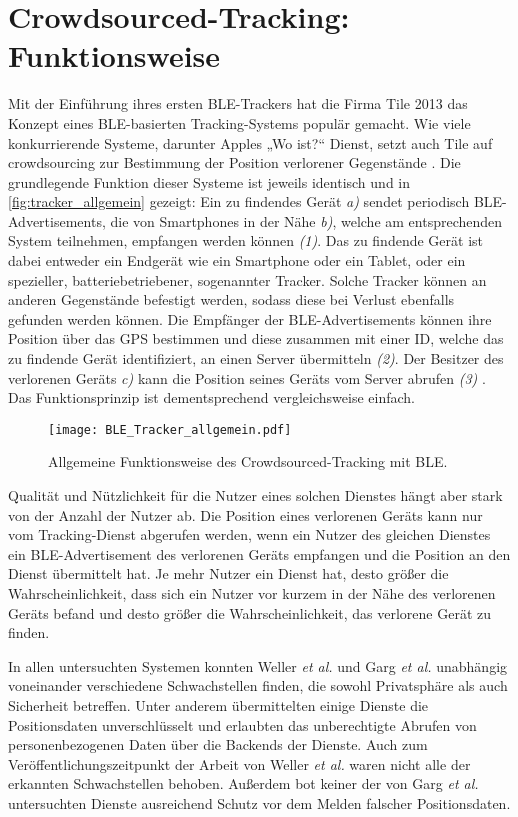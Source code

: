 \section{Crowdsourced-Tracking: Funktionsweise}
\label{sec:Funktionsweise}

Mit der Einführung ihres ersten \ac{BLE}-Trackers hat die Firma Tile 2013 das Konzept eines \ac{BLE}-basierten Tracking-Systems populär gemacht.
Wie viele konkurrierende Systeme, darunter Apples „Wo ist?“ Dienst, setzt auch Tile auf crowdsourcing zur Bestimmung der Position verlorener Gegenstände \cite{Weller_BLE_Finders}.
Die grundlegende Funktion dieser Systeme ist jeweils identisch und in \autoref{fig:tracker_allgemein} gezeigt: Ein zu findendes Gerät \textit{a)} sendet periodisch \ac{BLE}-Advertisements, die von Smartphones in der Nähe \textit{b)}, welche am entsprechenden System teilnehmen, empfangen werden können \textit{(1)}.
Das zu findende Gerät ist dabei entweder ein Endgerät wie ein Smartphone oder ein Tablet, oder ein spezieller, batteriebetriebener, sogenannter Tracker.
Solche Tracker können an anderen Gegenstände befestigt werden, sodass diese bei Verlust ebenfalls gefunden werden können.
Die Empfänger der \ac{BLE}-Advertisements können ihre Position über das \ac{GPS} bestimmen und diese zusammen mit einer ID, welche das zu findende Gerät identifiziert, an einen Server übermitteln \textit{(2)}.
Der Besitzer des verlorenen Geräts \textit{c)} kann die Position seines Geräts vom Server abrufen \textit{(3)} \cite{Garg_Secure_Tracker}.
Das Funktionsprinzip ist dementsprechend vergleichsweise einfach.
\begin{figure}[ht]
    \centering 
    \texttt{[image: BLE\_Tracker\_allgemein.pdf]}
    \caption{Allgemeine Funktionsweise des Crowdsourced-Tracking mit \ac{BLE}.}
    \label{fig:tracker_allgemein}
\end{figure}
Qualität und Nützlichkeit für die Nutzer eines solchen Dienstes hängt aber stark von der Anzahl der Nutzer ab.
Die Position eines verlorenen Geräts kann nur vom Tracking-Dienst abgerufen werden, wenn ein Nutzer des gleichen Dienstes ein \ac{BLE}-Advertisement des verlorenen Geräts empfangen und die Position an den Dienst übermittelt hat.
Je mehr Nutzer ein Dienst hat, desto größer die Wahrscheinlichkeit, dass sich ein Nutzer vor kurzem in der Nähe des verlorenen Geräts befand und desto größer die Wahrscheinlichkeit, das verlorene Gerät zu finden.


In allen untersuchten Systemen konnten Weller \textit{et al.} \cite{Weller_BLE_Finders} und Garg \textit{et al.} \cite{Garg_Secure_Tracker} unabhängig voneinander verschiedene Schwachstellen finden, die sowohl Privatsphäre als auch Sicherheit betreffen.
Unter anderem übermittelten einige Dienste die Positionsdaten unverschlüsselt und erlaubten das unberechtigte Abrufen von personenbezogenen Daten über die Backends der Dienste.
Auch zum Veröffentlichungszeitpunkt der Arbeit von Weller \textit{et al.} \cite{Weller_BLE_Finders} waren nicht alle der erkannten Schwachstellen behoben.
Außerdem bot keiner der von Garg \textit{et al.} \cite{Garg_Secure_Tracker} untersuchten Dienste ausreichend Schutz vor dem Melden falscher Positionsdaten.


